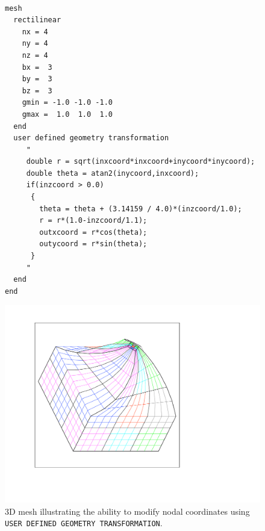 \begin{figure}[t]
  \centering
    \begin{minipage}{0.3\linewidth}
{\ttfamily \begin{verbatim}






mesh
  rectilinear
    nx = 4
    ny = 4
    nz = 4
    bx =  3
    by =  3
    bz =  3
    gmin = -1.0 -1.0 -1.0
    gmax =  1.0  1.0  1.0
  end
  user defined geometry transformation
     "
     double r = sqrt(inxcoord*inxcoord+inycoord*inycoord);
     double theta = atan2(inycoord,inxcoord);
     if(inzcoord > 0.0)
      {
        theta = theta + (3.14159 / 4.0)*(inzcoord/1.0);
        r = r*(1.0-inzcoord/1.1);
        outxcoord = r*cos(theta);
        outycoord = r*sin(theta);
      }
     "
  end
end
\end{verbatim}}
    \end{minipage}%
    \hfill
    \begin{minipage}[t]{0.65\linewidth}
        \includegraphics[width=4.8in]{3d_warped_geometry_white_bg}
    \end{minipage}
 \caption [3D Geometry Transformation Example]{3D mesh illustrating the ability to modify nodal coordinates using \texttt{USER
      DEFINED GEOMETRY TRANSFORMATION}.}
    \label{fig:3d_transform_example}
\end{figure}



